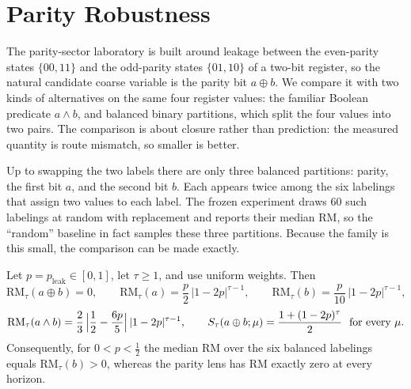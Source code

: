 \section{Parity Robustness}
\label{sec:results-parity}

The parity-sector laboratory is built around leakage between the even-parity states \(\{00,11\}\) and the odd-parity states \(\{01,10\}\) of a two-bit register, so the natural candidate coarse variable is the parity bit \(a \oplus b\). We compare it with two kinds of alternatives on the same four register values: the familiar Boolean predicate \(a \wedge b\), and balanced binary partitions, which split the four values into two pairs. The comparison is about closure rather than prediction: the measured quantity is route mismatch, so smaller is better.

Up to swapping the two labels there are only three balanced partitions: parity, the first bit \(a\), and the second bit \(b\). Each appears twice among the six labelings that assign two values to each label. The frozen experiment draws \(60\) such labelings at random with replacement and reports their median RM, so the ``random'' baseline in fact samples these three partitions. Because the family is this small, the comparison can be made exactly.

\begin{proposition}
\label{prop:parity-exact}
Let \(p=p_{\mathrm{leak}}\in[0,1]\), let \(\tau\ge 1\), and use uniform weights. Then
\[
\mathrm{RM}_\tau(a\oplus b)=0,\qquad
\mathrm{RM}_\tau(a)=\frac{p}{2}\,|1-2p|^{\tau-1},\qquad
\mathrm{RM}_\tau(b)=\frac{p}{10}\,|1-2p|^{\tau-1},
\]
\[
\mathrm{RM}_\tau(a\wedge b)=\frac{2}{3}\,\Bigl|\frac12-\frac{6p}{5}\Bigr|\,|1-2p|^{\tau-1},
\qquad
S_\tau(a\oplus b;\mu)=\frac{1+(1-2p)^{\tau}}{2}\ \text{ for every } \mu .
\]
Consequently, for \(0<p<\tfrac12\) the median RM over the six balanced labelings equals \(\mathrm{RM}_\tau(b)>0\), whereas the parity lens has RM exactly zero at every horizon.
\end{proposition}

